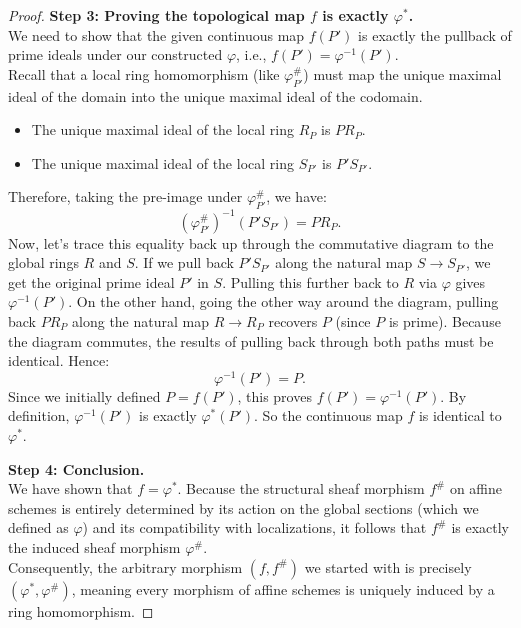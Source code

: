 \begin{proof}
\textbf{Step 3: Proving the topological map $f$ is exactly $\varphi^*$.} \\
We need to show that the given continuous map $f(P')$ is exactly the pullback of prime ideals under our constructed $\varphi$, i.e., $f(P') = \varphi^{-1}(P')$. \\
Recall that a local ring homomorphism (like $\varphi^\#_{P'}$) must map the unique maximal ideal of the domain into the unique maximal ideal of the codomain. 
\begin{itemize}
    \item The unique maximal ideal of the local ring $R_P$ is $P R_P$.
    \item The unique maximal ideal of the local ring $S_{P'}$ is $P' S_{P'}$.
\end{itemize}
Therefore, taking the pre-image under $\varphi^\#_{P'}$, we have:
\[
(\varphi^\#_{P'})^{-1}(P' S_{P'}) = P R_P.
\]
Now, let's trace this equality back up through the commutative diagram to the global rings $R$ and $S$.
If we pull back $P' S_{P'}$ along the natural map $S \to S_{P'}$, we get the original prime ideal $P'$ in $S$. Pulling this further back to $R$ via $\varphi$ gives $\varphi^{-1}(P')$.
On the other hand, going the other way around the diagram, pulling back $P R_P$ along the natural map $R \to R_P$ recovers $P$ (since $P$ is prime).
Because the diagram commutes, the results of pulling back through both paths must be identical. Hence:
\[
\varphi^{-1}(P') = P.
\]
Since we initially defined $P = f(P')$, this proves $f(P') = \varphi^{-1}(P')$. By definition, $\varphi^{-1}(P')$ is exactly $\varphi^*(P')$. So the continuous map $f$ is identical to $\varphi^*$.

\textbf{Step 4: Conclusion.} \\
We have shown that $f = \varphi^*$. Because the structural sheaf morphism $f^\#$ on affine schemes is entirely determined by its action on the global sections (which we defined as $\varphi$) and its compatibility with localizations, it follows that $f^\#$ is exactly the induced sheaf morphism $\varphi^\#$. \\
Consequently, the arbitrary morphism $(f, f^\#)$ we started with is precisely $(\varphi^*, \varphi^\#)$, meaning every morphism of affine schemes is uniquely induced by a ring homomorphism.
\end{proof}